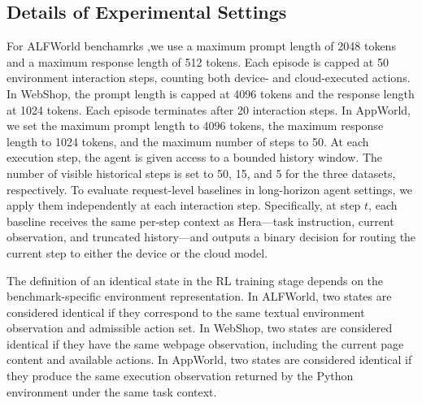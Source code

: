 \documentclass{article}
\newcommand{\needrev}[1]{{\color{darkgreen}#1}} %
\newcommand{\needrev}[1]{#1} %
\newcommand{\name}{Hera\xspace}
\begin{document}
\subsection{Details of Experimental Settings}
\label{append:exp_set}

For ALFWorld benchamrks ,we use a maximum prompt length of 2048 tokens and a maximum response length of 512 tokens.
Each episode is capped at 50 environment interaction steps, counting both device- and cloud-executed actions.
In WebShop, the prompt length is capped at 4096 tokens and the response length at 1024 tokens. Each episode terminates after 20 interaction steps.
In AppWorld, we set the maximum prompt length to 4096 tokens, the maximum response length to 1024 tokens, and the maximum number of steps to 50.
At each execution step, the agent is given access to a bounded history window. The number of visible historical steps is set to 50, 15, and 5 for the three datasets, respectively.
To evaluate request-level baselines in long-horizon agent settings, we apply them independently at each interaction step. Specifically, at step $t$, each baseline receives the same per-step context as \name—task instruction, current observation, and truncated history—and outputs a binary decision for routing the current step to either the device or the cloud model.

The definition of an identical state in the RL training stage depends on the benchmark-specific environment representation. In ALFWorld, two states are considered identical if they correspond to the same textual environment observation and admissible action set. In WebShop, two states are considered identical if they have the same webpage observation, including the current page content and available actions. In AppWorld, two states are considered identical if they produce the same execution observation returned by the Python environment under the same task context.
\end{document}
